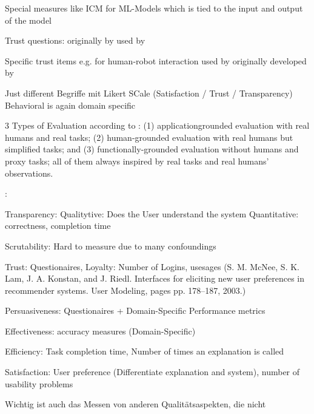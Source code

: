 Special measures like ICM for ML-Models which is tied to the input and output of the model \cite{waa_evaluating_2021, neerincx_using_2018}

Trust questions: originally by \cite{mayer1999effect} used by \cite{wang_is_2018}

Specific trust items e.g. for human-robot interaction used by \cite{zhu_effects_2020} originally developed by \cite{schaefer2013perception}

Just different Begriffe mit Likert SCale (Satisfaction / Trust / Transparency) \cite{koo_understanding_2016, koo_why_2015} Behavioral is again domain specific

3 Types of Evaluation according to \cite{ribera2019can, doshi2017towards}: (1) applicationgrounded evaluation with real humans and real tasks; (2) human-grounded evaluation with real humans but simplified tasks; and (3) functionally-grounded evaluation without humans and proxy tasks; all of them always inspired by real tasks and real humans’ observations.

 \cite{tintarev2007survey}:
 
 Transparency: Qualitytive: Does the User understand the system Quantitative: correctness, completion time
 
 Scrutability: Hard to measure due to many confoundings
 
 Trust: Questionaires, Loyalty: Number of Logins, usesages (S. M. McNee, S. K. Lam, J. A. Konstan, and J. Riedl. Interfaces for eliciting new user preferences in recommender systems. User Modeling, pages pp. 178–187, 2003.)
 
 Persuasiveness: Questionaires + Domain-Specific Performance metrics
 
 Effectiveness: accuracy measures (Domain-Specific) 
 
 Efficiency: Task completion time, Number of times an explanation is called
 
 Satisfaction: User preference (Differentiate explanation and system), number of usability problems
 
 Wichtig ist auch das Messen von anderen Qualitätsaspekten, die nicht 
